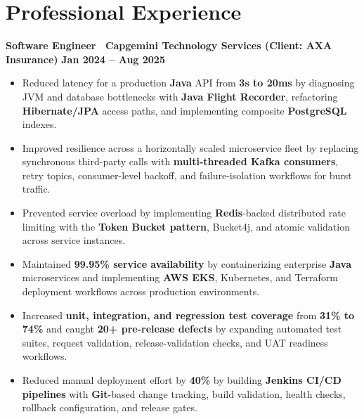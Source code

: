 \documentclass[10pt,letterpaper]{article}
\begin{document}
\section*{Professional Experience}
\textbf{Software Engineer \textbar\ Capgemini Technology Services
(Client: AXA Insurance)}
\hfill \textbf{Jan 2024 -- Aug 2025}
\begin{itemize}
  \item Reduced latency for a production \textbf{Java} API from
  \textbf{3s to 20ms} by diagnosing JVM and database bottlenecks with
  \textbf{Java Flight Recorder}, refactoring \textbf{Hibernate/JPA} access paths,
  and implementing composite \textbf{PostgreSQL} indexes.
  \item Improved resilience across a horizontally scaled microservice fleet
  by replacing synchronous third-party calls with \textbf{multi-threaded Kafka consumers},
  retry topics, consumer-level backoff, and failure-isolation workflows for burst traffic.
  \item Prevented service overload by implementing \textbf{Redis}-backed
  distributed rate limiting with the \textbf{Token Bucket pattern}, Bucket4j,
  and atomic validation across service instances.
  \item Maintained \textbf{99.95\% service availability} by containerizing
  enterprise \textbf{Java} microservices and implementing \textbf{AWS EKS},
  Kubernetes, and Terraform deployment workflows across production environments.
  \item Increased \textbf{unit, integration, and regression test coverage}
  from \textbf{31\% to 74\%} and caught \textbf{20+ pre-release defects}
  by expanding automated test suites, request validation, release-validation
  checks, and UAT readiness workflows.
  \item Reduced manual deployment effort by \textbf{40\%} by building
  \textbf{Jenkins CI/CD pipelines} with \textbf{Git}-based change tracking,
  build validation, health checks, rollback configuration, and release gates.
\end{itemize}
\vspace{2pt}
\end{document}
